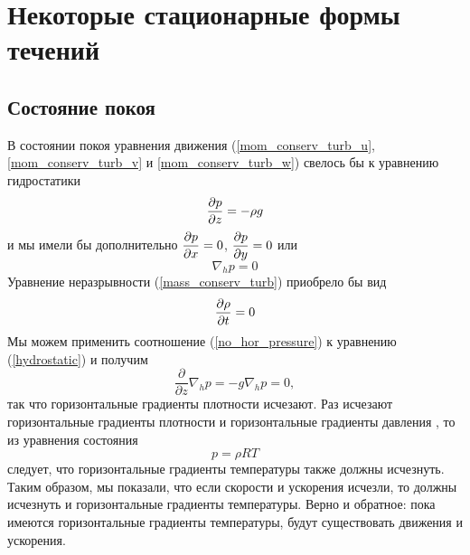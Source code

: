 \section{{\color{done}Некоторые стационарные формы течений}}

\subsection{{\color{done}Состояние покоя}}
    В состоянии покоя уравнения движения (\ref{mom_conserv_turb_u}, \ref{mom_conserv_turb_v} и \ref{mom_conserv_turb_w}) свелось бы к уравнению гидростатики
    \begin{equation}
    \label{hydrostatic}
        \displaystyle\frac{\partial p}{\partial z} = -\rho g
    \end{equation}
    и мы имели бы дополнительно $\displaystyle\frac{\partial p}{\partial x}=0$, $\displaystyle\frac{\partial p}{\partial y}=0$ или 
    \begin{equation}
    \nabla_h p=0    
    \end{equation}
    Уравнение неразрывности (\ref{mass_conserv_turb}) приобрело бы вид 
    \begin{equation}
    \label{no_hor_pressure}
        \displaystyle\frac{\partial \rho}{\partial t} = 0
    \end{equation}
    Мы можем применить соотношение (\ref{no_hor_pressure}) к уравнению (\ref{hydrostatic}) и получим
    \begin{equation}
        \frac{\partial}{\partial z}\nabla_h p = -g \nabla_h p = 0,
    \end{equation}
    так что горизонтальные градиенты плотности исчезают. Раз исчезают горизонтальные градиенты плотности и горизонтальные градиенты давления , то из уравнения состояния
    \begin{equation}
    \label{state_eq}
        p = \rho R T
    \end{equation}
    следует, что горизонтальные градиенты температуры также должны исчезнуть. Таким образом, мы показали, что если скорости и ускорения исчезли, то должны исчезнуть и горизонтальные градиенты температуры. Верно и обратное: пока имеются горизонтальные градиенты температуры, будут существовать движения и ускорения.

